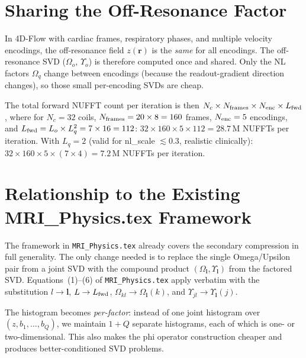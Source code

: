 \documentclass{article}
\begin{document}
\section{Sharing the Off-Resonance Factor}

In 4D-Flow with cardiac frames, respiratory phases, and multiple velocity encodings,
the off-resonance field $z(\mathbf{r})$ is the \emph{same} for all encodings.
The off-resonance SVD ($\Omega_o$, $\Upsilon_o$) is therefore computed once and
shared.  Only the NL factors $\Omega_q$ change between encodings (because the
readout-gradient direction changes), so those small per-encoding SVDs are cheap.

The total forward NUFFT count per iteration is then
$N_c \times N_{\rm frames} \times N_{\rm enc} \times L_{\rm fwd}$,
where for $N_c = 32$ coils, $N_{\rm frames} = 20 \times 8 = 160$ frames,
$N_{\rm enc} = 5$ encodings, and $L_{\rm fwd} = L_o \times L_q^2 = 7 \times 16 = 112$:
$32 \times 160 \times 5 \times 112 = 28.7\,\text{M}$ NUFFTs per iteration.
With $L_q = 2$ (valid for nl\_scale $\lesssim 0.3$, realistic clinically):
$32 \times 160 \times 5 \times (7 \times 4) = 7.2\,\text{M}$ NUFFTs per iteration.

\section{Relationship to the Existing MRI\_Physics.tex Framework}

The framework in \texttt{MRI\_Physics.tex} already covers the secondary compression
in full generality.  The only change needed is to replace the single Omega/Upsilon
pair from a joint SVD with the compound product
$(\Omega_{\boldsymbol{l}}, \Upsilon_{\boldsymbol{l}})$ from the factored SVD.
Equations~(1)--(6) of \texttt{MRI\_Physics.tex} apply verbatim with the
substitution $l \to \boldsymbol{l}$, $L \to L_{\rm fwd}$, $\Omega_{kl} \to
\Omega_{\boldsymbol{l}}(k)$, and $\Upsilon_{jl} \to \Upsilon_{\boldsymbol{l}}(j)$.

The histogram becomes \emph{per-factor}: instead of one joint histogram over
$(z, b_1, \ldots, b_Q)$, we maintain $1 + Q$ separate histograms, each of which
is one- or two-dimensional.  This also makes the phi operator construction cheaper
and produces better-conditioned SVD problems.
\end{document}
